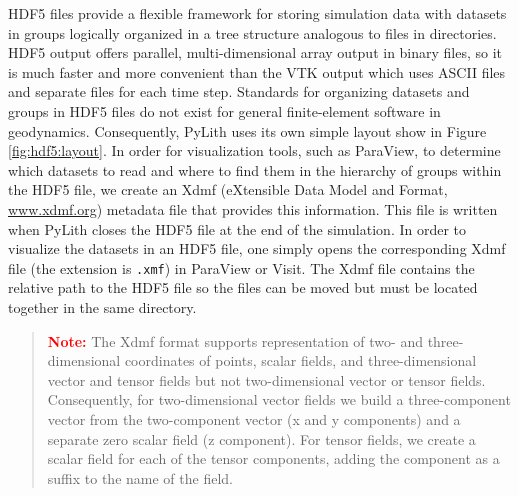 HDF5 files provide a flexible framework for storing simulation data
with datasets in groups logically organized in a tree structure analogous
to files in directories. HDF5 output offers parallel, multi-dimensional
array output in binary files, so it is much faster and more convenient
than the VTK output which uses ASCII files and separate files for
each time step. Standards for organizing datasets and groups in HDF5
files do not exist for general finite-element software in geodynamics.
Consequently, PyLith uses its own simple layout show in Figure \vref{fig:hdf5:layout}.
In order for visualization tools, such as ParaView, to determine which
datasets to read and where to find them in the hierarchy of groups
within the HDF5 file, we create an Xdmf (eXtensible Data Model and
Format, \url{www.xdmf.org}) metadata file that provides this information.
This file is written when PyLith closes the HDF5 file at the end of
the simulation. In order to visualize the datasets in an HDF5 file,
one simply opens the corresponding Xdmf file (the extension is \texttt{.xmf})
in ParaView or Visit. The Xdmf file contains the relative path to
the HDF5 file so the files can be moved but must be located together
in the same directory. 
\begin{quote}
\textbf{\textcolor{red}{Note:}}\textbf{ }The Xdmf format supports
representation of two- and three-dimensional coordinates of points,
scalar fields, and three-dimensional vector and tensor fields but
not two-dimensional vector or tensor fields. Consequently, for two-dimensional
vector fields we build a three-component vector from the two-component
vector (x and y components) and a separate zero scalar field (z component).
For tensor fields, we create a scalar field for each of the tensor
components, adding the component as a suffix to the name of the field.
\end{quote}

